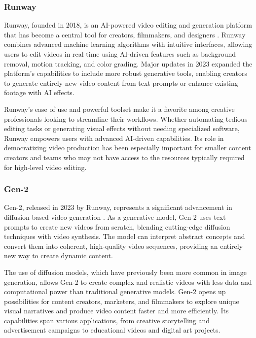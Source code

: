 \subsubsection{Runway}

Runway, founded in 2018, is an AI-powered video editing and generation platform that has become a central tool for creators, filmmakers, and designers \cite{ha2022runway}. 
Runway combines advanced machine learning algorithms with intuitive interfaces, allowing users to edit videos in real time using AI-driven features such as background removal, motion tracking, and color grading. 
Major updates in 2023 expanded the platform's capabilities to include more robust generative tools, enabling creators to generate entirely new video content from text prompts or enhance existing footage with AI effects.

Runway's ease of use and powerful toolset make it a favorite among creative professionals looking to streamline their workflows. 
Whether automating tedious editing tasks or generating visual effects without needing specialized software, Runway empowers users with advanced AI-driven capabilities. 
Its role in democratizing video production has been especially important for smaller content creators and teams who may not have access to the resources typically required for high-level video editing.

\subsubsection{Gen-2}

Gen-2, released in 2023 by Runway, represents a significant advancement in diffusion-based video generation \cite{esser2023gen2}. 
As a generative model, Gen-2 uses text prompts to create new videos from scratch, blending cutting-edge diffusion techniques with video synthesis. 
The model can interpret abstract concepts and convert them into coherent, high-quality video sequences, providing an entirely new way to create dynamic content.

The use of diffusion models, which have previously been more common in image generation, allows Gen-2 to create complex and realistic videos with less data and computational power than traditional generative models. 
Gen-2 opens up possibilities for content creators, marketers, and filmmakers to explore unique visual narratives and produce video content faster and more efficiently. 
Its capabilities span various applications, from creative storytelling and advertisement campaigns to educational videos and digital art projects.


